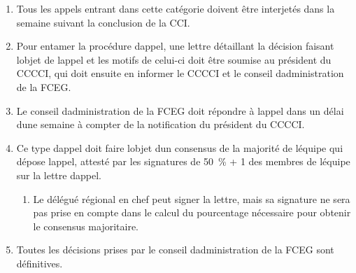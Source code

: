 \begin{enumerate}
 \item
  Tous les appels entrant dans cette catégorie doivent être interjetés dans la semaine suivant la conclusion de la CCI.
 \item
  Pour entamer la procédure d\textquotesingle appel, une lettre détaillant la décision faisant l\textquotesingle objet de l\textquotesingle appel et les motifs de celui-ci doit être soumise au président du CCCCI, qui doit ensuite en informer le CCCCI et le conseil d\textquotesingle administration de la FCEG.
 \item
  Le conseil d\textquotesingle administration de la FCEG doit répondre à l\textquotesingle appel dans un délai d\textquotesingle une semaine à compter de la notification du président du CCCCI.
 \item
  Ce type d\textquotesingle appel doit faire l\textquotesingle objet d\textquotesingle un consensus de la majorité de l\textquotesingle équipe qui dépose l\textquotesingle appel, attesté par les signatures de 50~\% + 1 des membres de l\textquotesingle équipe sur la lettre d\textquotesingle appel.

  \begin{enumerate}
   \item
    Le délégué régional en chef peut signer la lettre, mais sa signature ne sera pas prise en compte dans le calcul du pourcentage nécessaire pour obtenir le consensus majoritaire.
  \end{enumerate}

 \item
  Toutes les décisions prises par le conseil d\textquotesingle administration de la FCEG sont définitives.
\end{enumerate}
